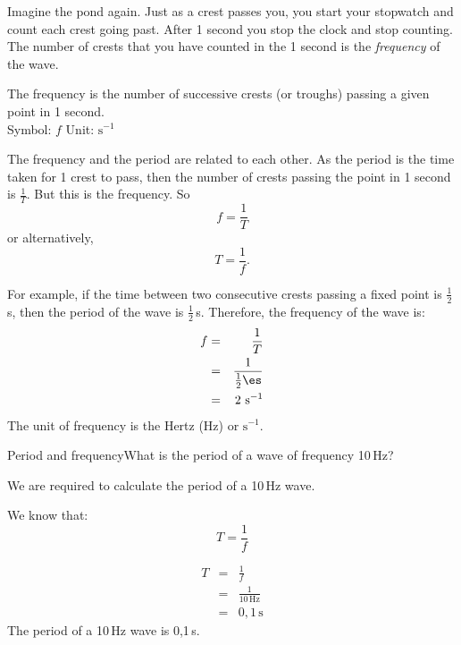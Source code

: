 \label{m38806*id319238}Imagine the pond again. Just as a crest passes you, you start your stopwatch and count each crest going past. After 1 second you stop the clock and stop counting. The number of crests that you have counted in the 1 second is the \textsl{frequency} of the wave.\par 

 { The frequency is the number of successive crests (or troughs) passing a given point in 1 second.\\
Symbol: $f$ \hspace{2cm} Unit: $\text{s}^{-1}$ } 
        
The frequency and the period are related to each other. As the period is the time taken for 1 crest to pass, then the number of crests passing the point in 1 second is $\frac{1}{T}$. But this is the frequency. So
\begin{equation*}
\boxed{f=\frac{1}{T}}
\end{equation*}
or alternatively,
\begin{equation*}
\boxed{T=\frac{1}{f}}.
\end{equation*}

For example, if the time between two consecutive crests passing a fixed point is $\frac{1}{2}\,$s, then the period of the wave is $\frac{1}{2}\,$s. Therefore, the frequency of the wave is:
\begin{eqnarray*}
f&=&\frac{1}{T}\\
&=&\frac{1}{\frac{1}{2}\es}\\
&=&2 \text{ s}^{-1}
\end{eqnarray*}
The unit of frequency is the Hertz (Hz) or $\text{s}^{-1}$.
\pagebreak

\begin{wex}{Period and frequency}{What is the period of a wave of frequency 10\,Hz?}{
We are required to calculate the period of a 10\,Hz wave.

We know that:
\begin{equation}
T=\frac{1}{f}\nonumber 
\end{equation}

\begin{eqnarray*}
T&=&\frac{1}{f}\\
&=&\frac{1}{10\,\text{Hz}}\\
&=&0,1\,\text{s}
\end{eqnarray*}
The period of a 10\,Hz wave is 0,1\,s.}
\end{wex}

